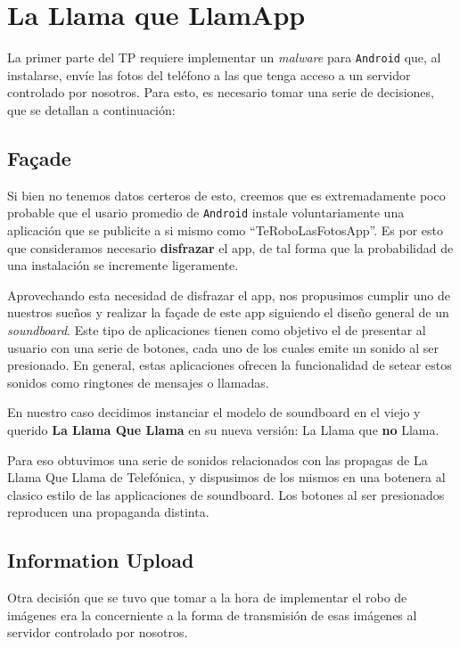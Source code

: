 \section{La Llama que LlamApp} %

La primer parte del TP requiere implementar un \emph{malware} para \texttt{Android} que, al instalarse, envíe las fotos del teléfono a las que tenga acceso a un servidor controlado por nosotros. Para esto, es necesario tomar una serie de decisiones, que se detallan a continuación:

\subsection{Façade} %
\label{sub:fa_ade}
Si bien no tenemos datos certeros de esto, creemos que es extremadamente poco probable que el usario promedio de \texttt{Android} instale voluntariamente una aplicación que se publicite a si mismo como ``TeRoboLasFotosApp''. Es por esto que consideramos necesario \textbf{disfrazar} el app, de tal forma que la probabilidad de una instalación se incremente ligeramente. 

Aprovechando esta necesidad de disfrazar el app, nos propusimos cumplir uno de nuestros sueños y realizar la façade de este app siguiendo el diseño general de un \textit{soundboard}. Este tipo de aplicaciones tienen como objetivo el de presentar al usuario con una serie de botones, cada uno de los cuales emite un sonido al ser presionado. En general, estas aplicaciones ofrecen la funcionalidad de setear estos sonidos como ringtones de mensajes o llamadas.

En nuestro caso decidimos instanciar el modelo de soundboard en el viejo y querido \textbf{La Llama Que Llama} en su nueva versión: La Llama que \textbf{no} Llama.

Para eso obtuvimos una serie de sonidos relacionados con las propagas de La Llama Que Llama de Telefónica, y dispusimos de los mismos en una botenera al clasico estilo de las applicaciones de soundboard. Los botones al ser presionados reproducen una propaganda distinta.

\subsection{Information Upload} %
\label{sub:Information Upload}
Otra decisión que se tuvo que tomar a la hora de implementar el robo de imágenes era la concerniente a la forma de transmisión de esas imágenes al servidor controlado por nosotros. 

